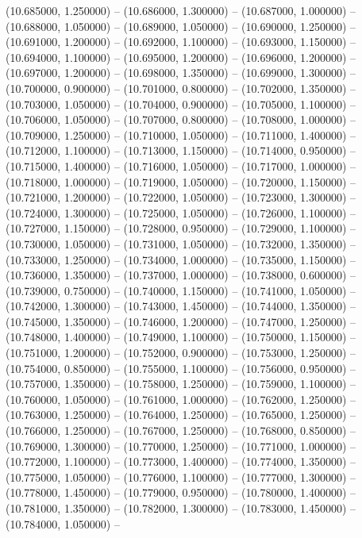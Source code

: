 (10.685000, 1.250000) -- 
(10.686000, 1.300000) -- 
(10.687000, 1.000000) -- 
(10.688000, 1.050000) -- 
(10.689000, 1.050000) -- 
(10.690000, 1.250000) -- 
(10.691000, 1.200000) -- 
(10.692000, 1.100000) -- 
(10.693000, 1.150000) -- 
(10.694000, 1.100000) -- 
(10.695000, 1.200000) -- 
(10.696000, 1.200000) -- 
(10.697000, 1.200000) -- 
(10.698000, 1.350000) -- 
(10.699000, 1.300000) -- 
(10.700000, 0.900000) -- 
(10.701000, 0.800000) -- 
(10.702000, 1.350000) -- 
(10.703000, 1.050000) -- 
(10.704000, 0.900000) -- 
(10.705000, 1.100000) -- 
(10.706000, 1.050000) -- 
(10.707000, 0.800000) -- 
(10.708000, 1.000000) -- 
(10.709000, 1.250000) -- 
(10.710000, 1.050000) -- 
(10.711000, 1.400000) -- 
(10.712000, 1.100000) -- 
(10.713000, 1.150000) -- 
(10.714000, 0.950000) -- 
(10.715000, 1.400000) -- 
(10.716000, 1.050000) -- 
(10.717000, 1.000000) -- 
(10.718000, 1.000000) -- 
(10.719000, 1.050000) -- 
(10.720000, 1.150000) -- 
(10.721000, 1.200000) -- 
(10.722000, 1.050000) -- 
(10.723000, 1.300000) -- 
(10.724000, 1.300000) -- 
(10.725000, 1.050000) -- 
(10.726000, 1.100000) -- 
(10.727000, 1.150000) -- 
(10.728000, 0.950000) -- 
(10.729000, 1.100000) -- 
(10.730000, 1.050000) -- 
(10.731000, 1.050000) -- 
(10.732000, 1.350000) -- 
(10.733000, 1.250000) -- 
(10.734000, 1.000000) -- 
(10.735000, 1.150000) -- 
(10.736000, 1.350000) -- 
(10.737000, 1.000000) -- 
(10.738000, 0.600000) -- 
(10.739000, 0.750000) -- 
(10.740000, 1.150000) -- 
(10.741000, 1.050000) -- 
(10.742000, 1.300000) -- 
(10.743000, 1.450000) -- 
(10.744000, 1.350000) -- 
(10.745000, 1.350000) -- 
(10.746000, 1.200000) -- 
(10.747000, 1.250000) -- 
(10.748000, 1.400000) -- 
(10.749000, 1.100000) -- 
(10.750000, 1.150000) -- 
(10.751000, 1.200000) -- 
(10.752000, 0.900000) -- 
(10.753000, 1.250000) -- 
(10.754000, 0.850000) -- 
(10.755000, 1.100000) -- 
(10.756000, 0.950000) -- 
(10.757000, 1.350000) -- 
(10.758000, 1.250000) -- 
(10.759000, 1.100000) -- 
(10.760000, 1.050000) -- 
(10.761000, 1.000000) -- 
(10.762000, 1.250000) -- 
(10.763000, 1.250000) -- 
(10.764000, 1.250000) -- 
(10.765000, 1.250000) -- 
(10.766000, 1.250000) -- 
(10.767000, 1.250000) -- 
(10.768000, 0.850000) -- 
(10.769000, 1.300000) -- 
(10.770000, 1.250000) -- 
(10.771000, 1.000000) -- 
(10.772000, 1.100000) -- 
(10.773000, 1.400000) -- 
(10.774000, 1.350000) -- 
(10.775000, 1.050000) -- 
(10.776000, 1.100000) -- 
(10.777000, 1.300000) -- 
(10.778000, 1.450000) -- 
(10.779000, 0.950000) -- 
(10.780000, 1.400000) -- 
(10.781000, 1.350000) -- 
(10.782000, 1.300000) -- 
(10.783000, 1.450000) -- 
(10.784000, 1.050000) -- 
